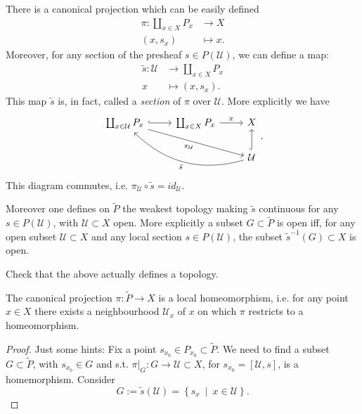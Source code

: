 \documentclass[../Main]{subfiles}
\begin{document}
There is a canonical projection which can be easily defined
\begin{align}
	\pi: \coprod_{x \in X} P_x &\longrightarrow X \\
	\left(x, s_x\right) &\longmapsto x \nonumber
.\end{align} 
Moreover, for any section of the presheaf $s \in P(\mathcal{U})$,
we can define a map:
\begin{align}
	\tilde{s}: \mathcal{U} &\longrightarrow \coprod_{x \in X} P_x \\
	x &\longmapsto \left(x, s_x\right) \nonumber
.\end{align} 
This map $\tilde{s}$ is, in fact, called a {\em section} of $\pi$ over $\mathcal{U}$.
More explicitly we have
\begin{equation}
\begin{tikzcd}
	\coprod_{x \in \mathcal{U}} P_x \arrow[rrd, "\pi_{\mathcal{U}}"', rightarrow] 
	\arrow[r, "", hookrightarrow] &
	\coprod_{x \in X} P_x \arrow[r, "\pi", rightarrow] &
	X \\
	&&
	\mathcal{U} \arrow[u, "", hookrightarrow] 
	\arrow[llu, "\tilde{s}", rightarrow, bend left] 
\end{tikzcd}
.\end{equation} 
This diagram commutes, i.e. $\pi_{\mathcal{U}} \circ \tilde{s} = id_{\mathcal{U}}$.

Moreover one defines on $\widetilde{P}$ the weakest topology making $\tilde{s}$ continuous
for any $s \in P(\mathcal{U})$, with $\mathcal{U} \subset X$ open.
More explicitly a subset $G \subset \widetilde{P}$ is open iff,
for any open subset $\mathcal{U} \subset X$ and any local section $s \in P(\mathcal{U})$,
the subset $\tilde{s}^{-1}(G) \subset X$ is open.

\begin{exr}
	Check that the above actually defines a topology.
\end{exr} 

\begin{prop}[]
	The canonical projection $\pi\colon \widetilde{P} \to X$ is
	a local homeomorphism, i.e. for any point $x \in X$ there exists a neighbourhood
	$\mathcal{U}_x$ of $x$ on which $\pi$ restricts to a homeomorphism.
\end{prop}
\begin{proof}
	Just some hints:
	Fix a point $s_{x_0} \in P_{x_0} \subset \widetilde{P}$.
	We need to find a subset $G \subset \widetilde{P}$, with $s_{x_0} \in G$ and s.t.
	$\left.\pi\right|_{G} \colon G \to \mathcal{U} \subset X$, for 
	$s_{x_0} = [\mathcal{U}, s]$, is a homemorphism.
	Consider
	\begin{equation}
		G := \tilde{s}(\mathcal{U}) =
		\left\{ s_x \ \middle|\ x \in \mathcal{U} \right\}
	.\end{equation} 
\end{proof}
\end{document}
